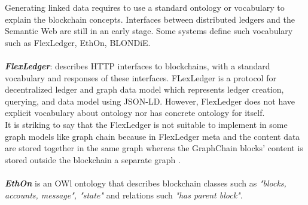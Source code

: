 Generating linked data requires to use a standard ontology or vocabulary to explain the blockchain concepts. Interfaces between distributed ledgers and the Semantic Web are still in an early stage. Some systems define such vocabulary such as FlexLedger, EthOn, BLONDiE\cite{Third}.\\
\\
\textbf{\textit{FlexLedger}}: describes HTTP interfaces to blockchains, with a standard vocabulary and responses of these interfaces. FLexLedger is a protocol for decentralized ledger and graph data model which represents ledger creation, querying, and data model using JSON-LD. However, FlexLedger does not have explicit vocabulary about ontology nor has concrete ontology for itself. \\
It is striking to say that the FlexLedger is not suitable to implement in some graph models like graph chain because in FlexLedger meta and the content data are stored together in the same graph whereas the GraphChain blocks’ content is stored outside the blockchain a separate graph \cite{Sopek}.\\
\\
\textbf{\textit{EthOn}} is an OWl ontology that describes blockchain classes such as \textit{"blocks, accounts, message", "state"} and relations such \textit{"has parent block"}\cite{Rashid}. 
